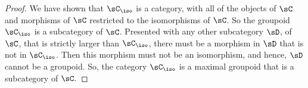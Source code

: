 \documentclass[main.tex]{subfiles}
\begin{document}
\begin{proof}
	We have shown that \(\sC_{\iso}\) is a category, with all of the objects of
	\(\sC\) and morphisms of \(\sC\) restricted to the isomorphisms of
	\(\sC\). So the groupoid \(\sC_{\iso}\) is a
	subcategory of \(\sC\). Presented with any other subcategory \(\sD\), of \(\sC\), that is
	strictly larger than \(\sC_{\iso}\), there must be a morphism in \(\sD\) that is
	not in \(\sC_{\iso}\). Then this morphism must not be an isomorphism, and
	hence, \(\sD\) cannot be a groupoid. So, the category \(\sC_{\iso}\) is a maximal
	groupoid that is a subcategory of \(\sC.\)
\end{proof}
\end{document}
